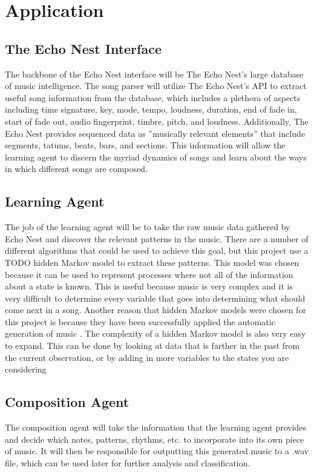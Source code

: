 \documentclass{article}
\begin{document}
\section{Application}
\subsection{The Echo Nest Interface}
The backbone of the Echo Nest interface will be The Echo Nest’s large database of music intelligence. The
song parser will utilize The Echo Nest’s API to extract useful song information from the database, which
includes a plethora of aspects including time signature, key, mode, tempo, loudness, duration, end of fade
in, start of fade out, audio fingerprint, timbre, pitch, and loudness. Additionally, The Echo Nest provides
sequenced data as ”musically relevant elements” that include segments, tatums, beats, bars, and sections.
This information will allow the learning agent to discern the myriad dynamics of songs and learn about the
ways in which different songs are composed.

\subsection{Learning Agent}
The job of the learning agent will be to take the raw music data gathered by Echo Nest and discover the
relevant patterns in the music. There are a number of different algorithms that could be used to achieve this
goal, but this project use a \Large{TODO} hidden Markov model to extract these patterns. This model was chosen because
it can be used to represent processes where not all of the information about a state is known. This is useful
because music is very complex and it is very difficult to determine every variable that goes into determining
what should come next in a song. Another reason that hidden Markov models were chosen for this project
is because they have been successfully applied the automatic generation of music \cite{5492670}.
The complexity of a hidden Markov model is also very easy to expand. This can be done by looking at data that is farther in
the past from the current observation, or by adding in more variables to the states you are considering

\subsection{Composition Agent}
The composition agent will take the information that the learning agent provides and decide which notes,
patterns, rhythms, etc. to incorporate into its own piece of music. It will then be responsible for outputting
this generated music to a .wav file, which can be used later for further analysis and classification.
\end{document}
